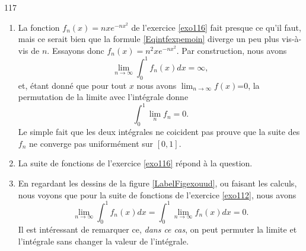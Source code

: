 

\begin{corrige}{117}

\begin{enumerate}
\item La fonction $f_n(x)=nx e^{-nx^2}$ de l'exercice \ref{exo116} fait presque ce qu'il faut, mais ce serait bien que la formule \eqref{Eqintfexpemoin} diverge un peu plus vis-à-vis de $n$. Essayons donc $f_n(x)=n^2x e^{-nx^2}$. Par construction, nous avons
\begin{equation}
	\lim_{n\to\infty}\int_0^1f_n(x)dx=\infty,
\end{equation}
et, étant donné que pour tout $x$ nous avons $\lim_{n\to\infty}f(x)$=0, la permutation de la limite avec l'intégrale donne
\begin{equation}
	\int_0^1\lim_{n}f_n=0.
\end{equation}
Le simple fait que les deux intégrales ne coicident pas prouve que la suite des $f_n$ ne converge pas uniformément sur $[0,1]$.

\item La suite de fonctions de l'exercice \ref{exo116} répond à la question.

\item En regardant les dessins de la figure \ref{LabelFigexouud}, ou faisant les calculs, nous voyons que pour la suite de fonctions de l'exercice \ref{exo112}, nous avons
\begin{equation}
	\lim_{n\to\infty}\int_0^1f_n(x)dx=\int_0^1\lim_{n\to\infty}f_n(x)dx=0.
\end{equation}
Il est intéressant de remarquer ce, \emph{dans ce cas}, on peut permuter la limite et l'intégrale sans changer la valeur de l'intégrale.
\end{enumerate}

\end{corrige}

